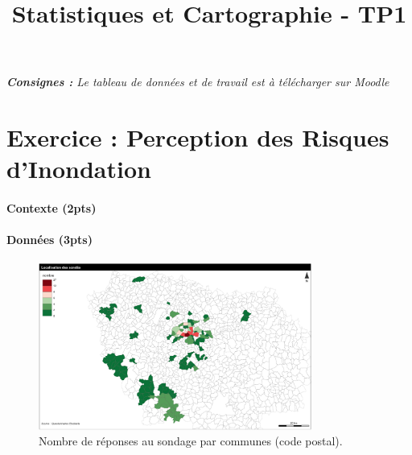 





\title{\textbf{Statistiques et Cartographie - TP1}}

\date{}


\maketitle

\justify

\thispagestyle{firststyle}


\textit{\textbf{Consignes : }Le tableau de données et de travail \texttt{} est à télécharger sur Moodle}


\bigskip


\section*{Exercice : Perception des Risques d'Inondation}

\paragraph{Contexte (2pts)}


\textit{}




\paragraph{Données (3pts)}




\begin{figure}
\centering
\includegraphics[width=0.8\textwidth]{maps/count2}
\caption{Nombre de réponses au sondage par communes (code postal).}
\end{figure}



